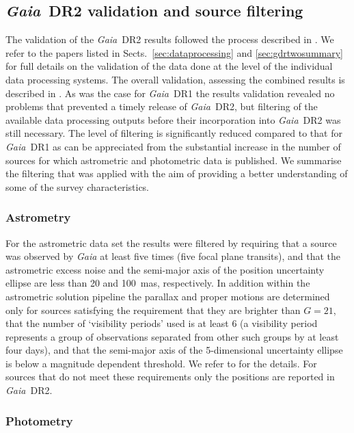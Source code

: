 \documentclass[longauth]{aa_gaia} %
\newcommand\gaia{\textit{Gaia}}
\newcommand\gdr[1]{\gaia~DR#1}
\newcommand\secsref[1]{Sects.~\ref{#1}}
\begin{document}
\subsection{\gdr{2} validation and source filtering}
\label{sec:gdrtwovalidation}

The validation of the \gdr{2} results followed the process described in
\cite{2016A&A...595A...2G}. We refer to the papers listed in \secsref{sec:dataprocessing} and
\ref{sec:gdrtwosummary} for full details on the validation of the data done at the level of the
individual data processing systems. The overall validation, assessing the combined results is
described in \cite{DR2-DPACP-39}. As was the case for \gdr{1} the results validation revealed no
problems that prevented a timely release of \gdr{2}, but filtering of the available data
processing outputs before their incorporation into \gdr{2} was still necessary. The level of
filtering is significantly reduced compared to that for \gdr{1} as can be appreciated from the
substantial increase in the number of sources for which astrometric and photometric data is
published. We summarise the filtering that was applied with the aim of providing a better
understanding of some of the survey characteristics.

\subsubsection{Astrometry}

For the astrometric data set the results were filtered by requiring that a source was observed by
{\gaia} at least five times (five focal plane transits), and that the astrometric excess noise and
the semi-major axis of the position uncertainty ellipse are less than 20 and 100~mas, respectively.
In addition within the astrometric solution pipeline the parallax and proper motions are determined
only for sources satisfying the requirement that they are brighter than $G=21$, that the number of
`visibility periods' used is at least 6 (a visibility period represents a group of observations
separated from other such groups by at least four days), and that the semi-major axis of the
5-dimensional uncertainty ellipse is below a magnitude dependent threshold.  We refer to
\cite{DR2-DPACP-51} for the details. For sources that do not meet these requirements only the
positions are reported in \gdr{2}.

\subsubsection{Photometry}
\end{document}
